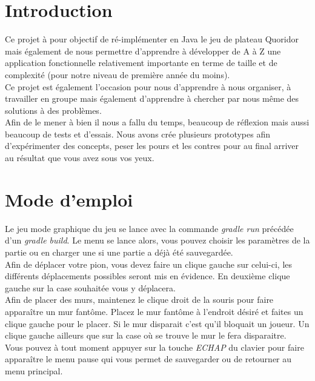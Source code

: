 \documentclass[a4paper, 12pt]{article}
\begin{document}
\tableofcontents

\newpage

\section{Introduction}

Ce projet à pour objectif de ré-implémenter en Java le jeu de plateau Quoridor mais également de nous permettre d'apprendre à développer de A à Z une application fonctionnelle relativement importante en terme de taille et de complexité (pour notre niveau de première année du moins). \\

Ce projet est également l'occasion pour nous d'apprendre à nous organiser, à travailler en groupe mais également d'apprendre à chercher par nous même des solutions à des problèmes. \\

Afin de le mener à bien il nous a fallu du temps, beaucoup de réflexion mais aussi beaucoup de tests et d'essais. Nous avons crée plusieurs prototypes afin d'expérimenter des concepts, peser les pours et les contres pour au final arriver au résultat que vous avez sous vos yeux.

\section{Mode d'emploi}

Le jeu mode graphique du jeu se lance avec la commande \textit{gradle run} précédée d'un
\textit{gradle build}. Le menu se lance alors, vous pouvez choisir les paramètres de la
partie ou en charger une si une partie a déjà été sauvegardée. \\

Afin de déplacer votre pion, vous devez faire un clique gauche sur celui-ci, les différents déplacements possibles seront mis en évidence. En deuxième clique gauche sur la case souhaitée vous y déplacera. \\

Afin de placer des murs, maintenez le clique droit de la souris pour faire apparaître un mur fantôme. Placez le mur fantôme à l'endroit désiré et faites un clique gauche pour le placer. Si le mur disparait c'est qu'il bloquait un joueur.
Un clique gauche ailleurs que sur la case où se trouve le mur le fera disparaitre. \\

Vous pouvez à tout moment appuyer sur la touche \textit{ECHAP} du clavier pour faire apparaître le menu pause qui vous permet de sauvegarder ou de retourner au menu principal.
\end{document}
